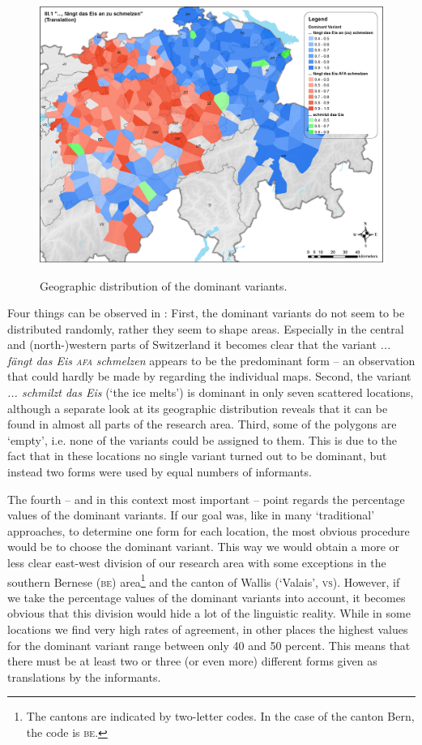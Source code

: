 \documentclass[output=paper]{LSP/langsci}
\begin{document}
\begin{figure}
\includegraphics[width=\textwidth]{illustrations/stoeck_fig3}
\label{fig:3}
\caption{Geographic distribution of the dominant variants.}
\end{figure}

Four things can be observed in : First, the dominant variants do not seem to be distributed randomly, rather they seem to shape areas. Especially in the central and (north-)western parts of Switzerland it becomes clear that the variant \emph{... fängt das Eis }\emph{\textsc{afa}}\emph{ schmelzen} appears to be the predominant form – an observation that could hardly be made by regarding the individual maps. Second, the variant \emph{... schmilzt das Eis} (‘the ice melts’) is dominant in only seven scattered locations, although a separate look at its geographic distribution reveals that it can be found in almost all parts of the research area. Third, some of the polygons are ‘empty’, i.e. none of the variants could be assigned to them. This is due to the fact that in these locations no single variant turned out to be dominant, but instead two forms were used by equal numbers of informants.

The fourth –  and in this context most important –  point regards the percentage values of the dominant variants. If our goal was, like in many ‘traditional’ approaches, to determine one form for each location, the most obvious procedure would be to choose the dominant variant. This way we would obtain a more or less clear east-west division of our research area with some exceptions in the southern Bernese (\textsc{be}) area\footnote{The cantons are indicated by two-letter codes. In the case of the canton Bern, the code is \textsc{be}.} and the canton of Wallis (‘Valais’, \textsc{vs}). However, if we take the percentage values of the dominant variants into account, it becomes obvious that this division would hide a lot of the linguistic reality. While in some locations we find very high rates of agreement, in other places the highest values for the dominant variant range between only 40 and 50 percent. This means that there must be at least two or three (or even more) different forms given as translations by the informants.
\end{document}
